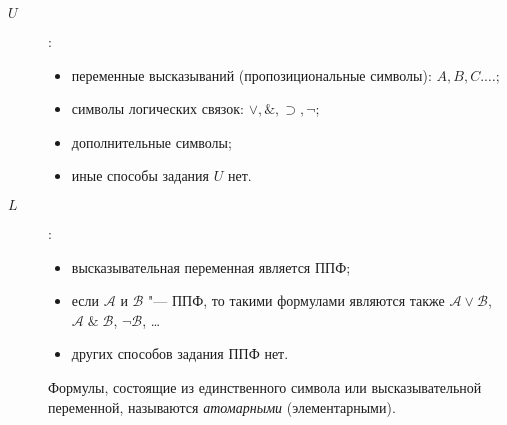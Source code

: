 \begin{description}
\item[$U$]:
  \begin{itemize}
  \item переменные высказываний (пропозициональные символы):
$A,B,C.\ldots$;
  \item символы логических связок: $\lor,\&,\supset,\lnot$;
  \item дополнительные символы;
  \item иные способы задания $U$ нет.
  \end{itemize}
\item[$L$]:
  \begin{itemize}
  \item высказывательная переменная является ППФ;
  \item если $\mathcal A$ и $\mathcal B$ "--- ППФ, то такими формулами
являются также $\mathcal{A\lor B}$, $\mathcal{A\;\&\;B}$,
$\mathcal{\lnot B}$, \ldots
  \item других способов задания ППФ нет.
  \end{itemize}

  \begin{rem} Формулы, состоящие из единственного символа или
высказывательной переменной, называются \emph{атомарными}
(элементарными).
  \end{rem}
  

\end{description}
